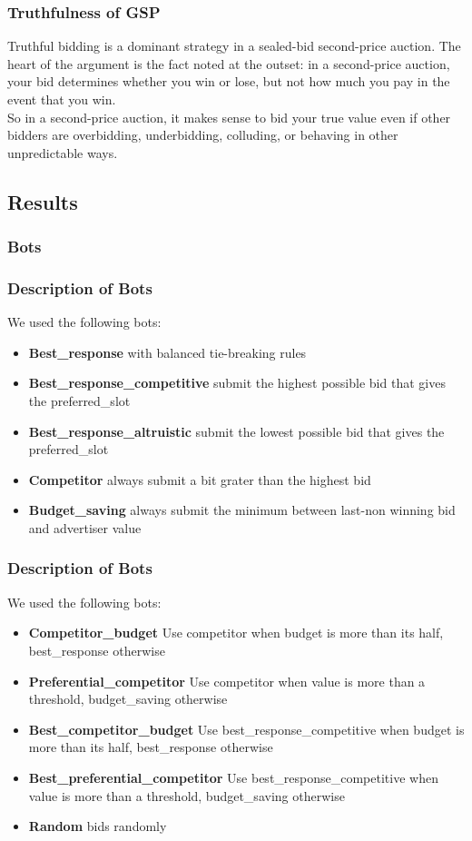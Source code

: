 \documentclass{beamer}
\begin{document}
\begin{frame}
\frametitle{Truthfulness of GSP}
Truthful bidding is a dominant strategy in a sealed-bid second-price auction. The heart of the argument is the fact noted at the outset: in a second-price auction, your bid determines whether you win or lose, but not how much you pay in the event that you win. \\
\medskip
So in a second-price auction, it makes sense to bid your true value even if other bidders are overbidding, underbidding, colluding, or behaving in other unpredictable ways.
\end{frame}

\subsection{Results}

\subsubsection{Bots}
\begin{frame}
\frametitle{Description of Bots}
We used the following bots:
\begin{itemize}
\item \textbf{Best\_response} with balanced tie-breaking rules
\item \textbf{Best\_response\_competitive} submit the highest possible bid that gives the preferred\_slot
\item \textbf{Best\_response\_altruistic } submit the lowest possible bid that gives the preferred\_slot
\item \textbf{Competitor} always submit a bit grater than the highest bid
\item \textbf{Budget\_saving} always submit the minimum between last-non winning bid and advertiser value
\end{itemize}
\end{frame}

\begin{frame}
\frametitle{Description of Bots}
We used the following bots:
\begin{itemize}
\item \textbf{Competitor\_budget} Use competitor when budget is more than its half, best\_response otherwise  
\item \textbf{Preferential\_competitor} Use competitor when value is more than a threshold, budget\_saving otherwise
\item \textbf{Best\_competitor\_budget} Use best\_response\_competitive when budget is more than its half, best\_response otherwise
\item \textbf{Best\_preferential\_competitor} Use best\_response\_competitive when value is more than a threshold, budget\_saving otherwise
\item \textbf{Random} bids randomly
\end{itemize}
\end{frame}
\end{document}
